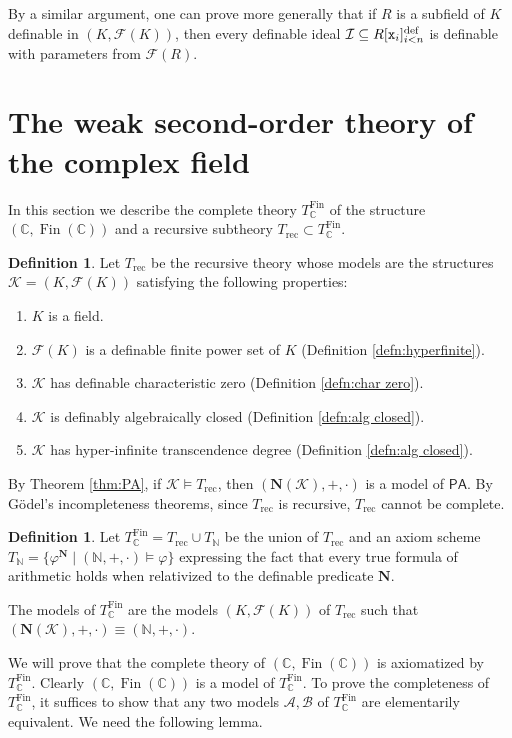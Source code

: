 \documentclass{amsart}
\newcommand{\C}{\mathbb C}
\newcommand{\N}{\mathbb N}
\newcommand{\ca}{\mathcal}
\newcommand{\ideal}[1]{\ca #1}
\newcommand{\Fin}{\operatorname{Fin}}
\theoremstyle{plain}
\theoremstyle{definition}
\newtheorem{defn}[thm]{Definition}
\newcommand{\F}{\mathcal{F}}
\newcommand{\PA}{\mathsf{PA}}
\newcommand{\hn}{\mathbf N}
\newcommand{\polyn}[2]{{#1}[{\tt x}_i]_{i<#2}^\text{def}}
\begin{document}
By a similar argument, one can prove more generally that if $R$ is a subfield of $K$ definable in $(K,\F(K))$, then every definable ideal $\ideal I\subseteq \polyn R n$ is definable with parameters from $\F(R)$.
\section{The weak second-order theory of the complex field}\label{sec:wso-complex}

In this section we describe the complete theory $T^{\Fin}_\C$ of the structure $(\mathbb{C},\Fin(\mathbb{C}))$ and a recursive subtheory $T_{\text{rec}} \subset T^{\Fin}_\C$. 

\begin{defn}\label{defn:complete} Let $T_{\text{rec}}$ be the recursive theory whose models are the structures $\ca K = (K,\F(K))$ satisfying the following properties: 
\begin{enumerate}
\item $K$ is a field. 
\item $\F (K)$ is a definable finite power set of $K$ (Definition \ref{defn:hyperfinite}). 
\item $\ca K$ has definable characteristic zero (Definition \ref{defn:char zero}). 
\item $\ca K$ is definably algebraically closed (Definition \ref{defn:alg closed}). 
\item $\ca K$ has hyper-infinite transcendence degree (Definition \ref{defn:alg closed}). 
\end{enumerate}
\end{defn}
By Theorem \ref{thm:PA}, if $\ca K\models T_{\text{rec}}$, then $(\hn(\ca K),+,\cdot)$ is a model of $\PA$. By G\"odel's incompleteness theorems, since $T_{\text{rec}}$ is recursive, $T_{\text{rec}}$ cannot be complete. 

\begin{defn} 
Let $T^{\Fin}_\C = T_{\text{rec}} \cup T_\N$ be the union of $T_{\text{rec}}$ and an axiom scheme $T_\N = \{\varphi^{\hn} \mid (\N,+,\cdot) \models \varphi\}$ expressing the fact that every true formula of arithmetic holds when relativized to the definable predicate $\hn$. 

The models of $T^{\Fin}_\C$ are the models $(K, \F(K))$ of $T_{\text{rec}}$ such that $(\hn(\ca K),+,\cdot) \equiv (\mathbb N, +, \cdot)$.
\end{defn}


We will prove that the complete theory of $(\C, \Fin(\C))$ is axiomatized by $T^{\Fin}_\C$. 
Clearly $(\C, \Fin(\C))$ is a model of $T^{\Fin}_\C$. To prove the completeness of $T^{\Fin}_\C$, it suffices to show that any two models $\ca A, \ca B$ of $T^{\Fin}_\C$ are elementarily equivalent. We need the following lemma. 
\end{document}
